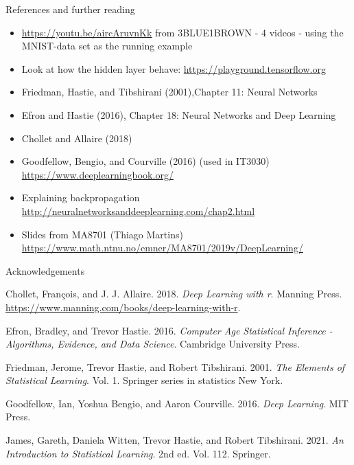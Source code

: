 \documentclass[
  10pt,
  ignorenonframetext,
]{beamer}
\providecommand{\tightlist}{%
  \setlength{\itemsep}{0pt}\setlength{\parskip}{0pt}}
\newlength{\cslhangindent}
\newlength{\cslentryspacingunit} %
\newenvironment{CSLReferences}[2] %
 {%
  \setlength{\parindent}{0pt}
  \ifodd #1
  \let\oldpar\par
  \def\par{\hangindent=\cslhangindent\oldpar}
  \fi
  \setlength{\parskip}{#2\cslentryspacingunit}
 }%
 {}
\begin{document}
\begin{frame}{References and further reading}
\protect\hypertarget{references-and-further-reading}{}
\begin{itemize}
\tightlist
\item
  \url{https://youtu.be/aircAruvnKk} from 3BLUE1BROWN - 4 videos - using
  the MNIST-data set as the running example
\item
  Look at how the hidden layer behave:
  \url{https://playground.tensorflow.org}
\item
  Friedman, Hastie, and Tibshirani (2001),Chapter 11: Neural Networks
\item
  Efron and Hastie (2016), Chapter 18: Neural Networks and Deep Learning
\item
  Chollet and Allaire (2018)
\item
  Goodfellow, Bengio, and Courville (2016) (used in IT3030)
  \url{https://www.deeplearningbook.org/}
\item
  Explaining backpropagation
  \url{http://neuralnetworksanddeeplearning.com/chap2.html}
\item
  Slides from MA8701 (Thiago Martins)
  \url{https://www.math.ntnu.no/emner/MA8701/2019v/DeepLearning/}
\end{itemize}
\end{frame}

\begin{frame}{Acknowledgements}
\protect\hypertarget{acknowledgements-1}{}
\hypertarget{refs}{}
\begin{CSLReferences}{1}{0}
\leavevmode{}%
Chollet, François, and J. J. Allaire. 2018. \emph{Deep Learning with r}.
Manning Press. \url{https://www.manning.com/books/deep-learning-with-r}.

\leavevmode{}%
Efron, Bradley, and Trevor Hastie. 2016. \emph{Computer Age Statistical
Inference - Algorithms, Evidence, and Data Science}. Cambridge
University Press.

\leavevmode{}%
Friedman, Jerome, Trevor Hastie, and Robert Tibshirani. 2001. \emph{The
Elements of Statistical Learning}. Vol. 1. Springer series in statistics
New York.

\leavevmode{}%
Goodfellow, Ian, Yoshua Bengio, and Aaron Courville. 2016. \emph{Deep
Learning}. MIT Press.

\leavevmode{}%
James, Gareth, Daniela Witten, Trevor Hastie, and Robert Tibshirani.
2021. \emph{An Introduction to Statistical Learning}. 2nd ed. Vol. 112.
Springer.

\end{CSLReferences}
\end{frame}
\end{document}
